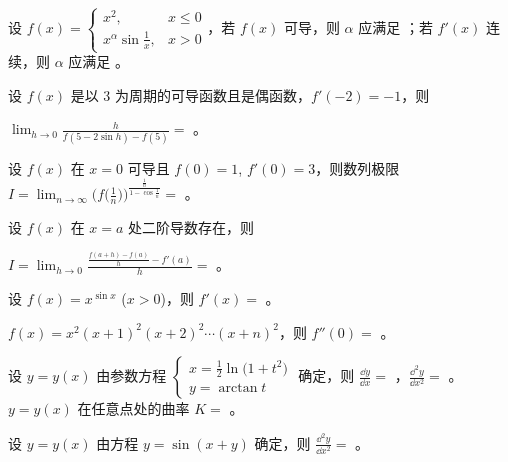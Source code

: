 \begin{ti}
	设 $f(x) = \begin{cases}
		x^2, & x \leq 0 \\
		x^\alpha \sin \frac{1}{x}, & x > 0
	\end{cases}$，若 $f(x)$ 可导，则 $\alpha$ 应满足 \hua；若 $f'(x)$ 连续，则 $\alpha$ 应满足 \hua。
\end{ti}

\begin{ti}
	设 $f(x)$ 是以 3 为周期的可导函数且是偶函数，$f'(-2) = -1$，则
	\begin{center}
		$\lim_{h \to 0} \frac{h}{f(5 - 2 \sin h) - f(5)} = $ \hua。
	\end{center}
\end{ti}

\begin{ti}
	设 $f(x)$ 在 $x = 0$ 可导且 $f(0) = 1$, $f'(0) = 3$，则数列极限 $I = \lim_{n \to \infty} \biggl( f\biggl( \frac{1}{n} \biggr) \biggr)^{\frac{\frac{1}{n}}{1 - \cos \frac{1}{n}}} = $ \hua。
\end{ti}

\begin{ti}
	设 $f(x)$ 在 $x = a$ 处二阶导数存在，则
	\begin{center}
		$I = \lim_{h \to 0} \frac{\frac{f(a+h) - f(a)}{h} - f'(a)}{h} = $ \hua。
	\end{center}
\end{ti}

\begin{ti}
	设 $f(x) = x^{\sin x}$ ($x>0$)，则 $f'(x) = $ \hua。
\end{ti}

\begin{ti}
	$f(x) = x^2 (x+1)^2 (x+2)^2 \cdots (x+n)^2$，则 $f''(0) = $ \hua。
\end{ti}

\begin{ti}
	设 $y = y(x)$ 由参数方程 $\begin{cases}
		x = \frac{1}{2} \ln \bigl( 1 + t^2 \bigr) \\
		y = \arctan t
	\end{cases}$ 确定，则 $\frac{\dd{y}}{\dd{x}} = $ \hua，$\frac{\dd^2{y}}{\dd{x^2}} = $ \hua。$y = y(x)$ 在任意点处的曲率 $K = $ \hua。
\end{ti}

\begin{ti}
	设 $y = y(x)$ 由方程 $y = \sin(x + y)$ 确定，则 $\frac{\dd^2{y}}{\dd{x^2}} = $ \hua。
\end{ti}


